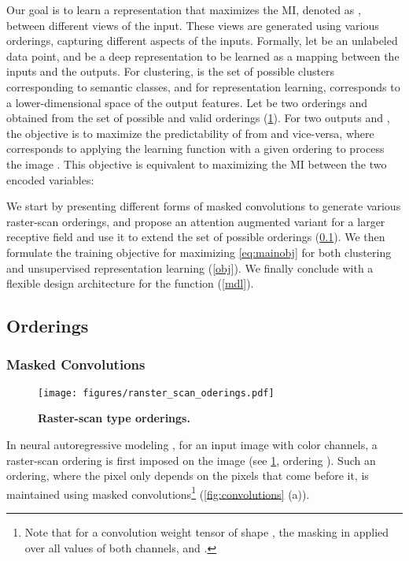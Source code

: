 
Our goal is to learn a representation that maximizes the MI, denoted as ,
between different views of the input. These views are generated using various orderings,
capturing different aspects  of the inputs.
Formally, let  be an unlabeled data point, and
 be a deep representation to be learned as a mapping
between the inputs and the outputs.
For clustering,  is the set of possible
clusters corresponding to semantic 
classes, and for representation learning,  corresponds to a lower-dimensional
space of the output features. Let  be
two orderings  and  obtained from the set of possible and valid 
orderings  (\cref{fig:raster_orderings}).
For two outputs  and ,
the objective is to maximize the predictability of  from
 and vice-versa, where  corresponds to applying the learning function 
with a given ordering  to process the image .
This objective is equivalent to maximizing the MI
between the two encoded variables:


We start by presenting different forms of masked convolutions
to generate various raster-scan orderings,
and propose an attention augmented variant
for a larger receptive field and use it to extend
the set of possible orderings (\cref{orderings}).
We then formulate the training objective for maximizing \cref{eq:mainobj}
for both clustering and unsupervised representation learning (\cref{obj}).
We finally conclude with a flexible design architecture
for the function  (\cref{mdl}).






\subsection{Orderings} \label{orderings}

\subsubsection{Masked Convolutions}

\begin{figure}[t]
\centering
\texttt{[image: figures/ranster\_scan\_oderings.pdf]}
\vspace{-0.3in}
\caption{\textbf{Raster-scan type orderings.}}
\label{fig:raster_orderings}
\vspace{-0.2in}
\end{figure}


In neural autoregressive modeling \cite{pcnn,pcnnpp,psnail}, for an input image 
with  color channels, a raster-scan
ordering is first imposed on the image (see \cref{fig:raster_orderings}, ordering ).
Such an ordering, where the pixel 
only depends on the pixels that come before it,
is maintained using masked convolutions\footnote{
Note that for a convolution weight tensor of shape , the masking in applied over all
values of both channels,  and .}
\cite{pcnn,prnn} (\cref{fig:convolutions} (a)).

